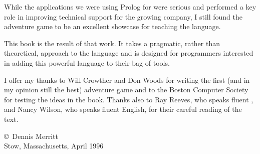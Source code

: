 While the applications we were using Prolog for were serious and performed a key
role in improving technical support for the growing company, I still found the
adventure game to be an excellent showcase for teaching the language.

This book is the result of that work. It takes a pragmatic, rather than
theoretical, approach to the language and is designed for programmers interested
in adding this powerful language to their bag of tools.

I offer my thanks to Will Crowther and Don Woods for writing the first (and in
my opinion still the best) adventure game and to the Boston Computer Society for
testing the ideas in the book. Thanks also to Ray Reeves, who speaks fluent
\prolog, and Nancy Wilson, who speaks fluent English, for their careful reading
of the text.

\bigskip\noindent\copyright\ Dennis Merritt\\Stow, Massachusetts, April 1996
